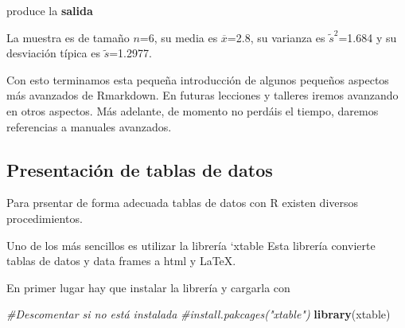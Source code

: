 \documentclass[]{article}
\newenvironment{Shaded}{\begin{snugshade}}{\end{snugshade}}
\newcommand{\KeywordTok}[1]{\textcolor[rgb]{0.13,0.29,0.53}{\textbf{{#1}}}}
\newcommand{\CommentTok}[1]{\textcolor[rgb]{0.56,0.35,0.01}{\textit{{#1}}}}
\newcommand{\NormalTok}[1]{{#1}}
\begin{document}
produce la \textbf{salida}

La muestra es de tamaño $n$=6, su media es $\overline{x}$=2.8, su
varianza es $\tilde{s}^2$=1.684 y su desviación típica es
$\tilde{s}$=1.2977.

Con esto terminamos esta pequeña introducción de algunos pequeños
aspectos más avanzados de Rmarkdown. En futuras lecciones y talleres
iremos avanzando en otros aspectos. Más adelante, de momento no perdáis
el tiempo, daremos referencias a manuales avanzados.

\subsection{Presentación de tablas de
datos}\label{presentacion-de-tablas-de-datos}

Para prsentar de forma adecuada tablas de datos con R existen diversos
procedimientos.

Uno de los más sencillos es utilizar la librería `xtable Esta librería
convierte tablas de datos y data frames a html y LaTeX.

En primer lugar hay que instalar la librería y cargarla con

\begin{Shaded}
\begin{Highlighting}[]
\CommentTok{#Descomentar si no está instalada}
\CommentTok{#install.pakcages("xtable")}
\KeywordTok{library}\NormalTok{(xtable)}
\end{Highlighting}
\end{Shaded}
\end{document}
